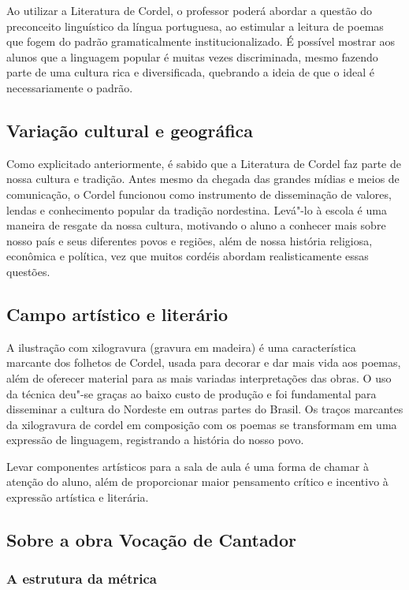 \documentclass[12pt]{extarticle}
\begin{document}
Ao utilizar a Literatura de Cordel, o professor poderá abordar a questão
do preconceito linguístico da língua portuguesa, ao estimular a leitura
de poemas que fogem do padrão gramaticalmente institucionalizado. É
possível mostrar aos alunos que a linguagem popular é muitas vezes
discriminada, mesmo fazendo parte de uma cultura rica e diversificada,
quebrando a ideia de que o ideal é necessariamente o padrão.

\subsection{Variação cultural e geográfica}

Como explicitado anteriormente, é sabido que a Literatura de Cordel faz
parte de nossa cultura e tradição. Antes mesmo da chegada das grandes
mídias e meios de comunicação, o Cordel funcionou como instrumento de
disseminação de valores, lendas e conhecimento popular da tradição
nordestina. Levá"-lo à escola é uma maneira de resgate da nossa cultura,
motivando o aluno a conhecer mais sobre nosso país e seus diferentes
povos e regiões, além de nossa história religiosa, econômica e política,
vez que muitos cordéis abordam realisticamente essas questões.

\subsection{Campo artístico e literário }

A ilustração com xilogravura (gravura em madeira) é uma característica
marcante dos folhetos de Cordel, usada para decorar e dar mais vida aos
poemas, além de oferecer material para as mais variadas interpretações
das obras. O uso da técnica deu"-se graças ao baixo custo de produção e
foi fundamental para disseminar a cultura do Nordeste em outras partes
do Brasil. Os traços marcantes da xilogravura de cordel em composição
com os poemas se transformam em uma expressão de linguagem, registrando
a história do nosso povo.

Levar componentes artísticos para a sala de aula é uma forma de chamar à
atenção do aluno, além de proporcionar maior pensamento crítico e
incentivo à expressão artística e literária.

\subsection{Sobre a obra Vocação de Cantador}

\subsubsection{A estrutura da métrica}
\end{document}
